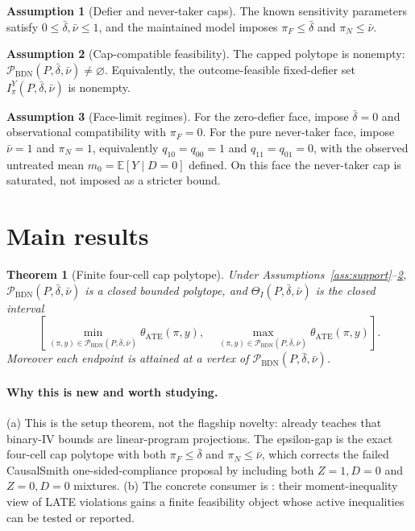 \documentclass[11pt]{article}
\newcommand{\E}{\mathbb{E}}
\theoremstyle{definition}
\newtheorem{assumption}{Assumption}
\theoremstyle{plain}
\newtheorem{theorem}{Theorem}
\theoremstyle{remark}
\begin{document}
\begin{assumption}[Defier and never-taker caps]\label{ass:caps}
The known sensitivity parameters satisfy \(0\le\bar\delta,\bar\nu\le1\), and
the maintained model imposes \(\pi_F\le\bar\delta\) and
\(\pi_N\le\bar\nu\).
\end{assumption}

\begin{assumption}[Cap-compatible feasibility]\label{ass:capped-feasible}
The capped polytope is nonempty:
\(\mathcal{P}_{\mathrm{BDN}}(P,\bar\delta,\bar\nu)\ne\varnothing\).
Equivalently, the outcome-feasible fixed-defier set
\(I_{\pi}^{Y}(P,\bar\delta,\bar\nu)\) is nonempty.
\end{assumption}

\begin{assumption}[Face-limit regimes]\label{ass:faces}
For the zero-defier face, impose \(\bar\delta=0\) and observational
compatibility with \(\pi_F=0\).  For the pure never-taker face, impose
\(\bar\nu=1\) and \(\pi_N=1\), equivalently \(q_{10}=q_{00}=1\) and
\(q_{11}=q_{01}=0\), with the observed untreated mean
\(m_0=\E[Y\mid D=0]\) defined.  On this face the never-taker cap is saturated,
not imposed as a stricter bound.
\end{assumption}

\section{Main results}
\begin{theorem}[Finite four-cell cap polytope]\label{thm:polytope-wellposed}
Under Assumptions~\ref{ass:support}--\ref{ass:capped-feasible},
\(\mathcal{P}_{\mathrm{BDN}}(P,\bar\delta,\bar\nu)\) is a closed bounded
polytope, and \(\Theta_I(P,\bar\delta,\bar\nu)\) is the closed interval
\[
\left[
\min_{(\pi,y)\in\mathcal{P}_{\mathrm{BDN}}(P,\bar\delta,\bar\nu)}
\theta_{\mathrm{ATE}}(\pi,y),\quad
\max_{(\pi,y)\in\mathcal{P}_{\mathrm{BDN}}(P,\bar\delta,\bar\nu)}
\theta_{\mathrm{ATE}}(\pi,y)
\right].
\]
Moreover each endpoint is attained at a vertex of
\(\mathcal{P}_{\mathrm{BDN}}(P,\bar\delta,\bar\nu)\).
\end{theorem}
\paragraph{Why this is new and worth studying.}
(a) This is the setup theorem, not the flagship novelty: \citet{BalkePearl1997}
already teaches that binary-IV bounds are linear-program projections.  The
epsilon-gap is the exact four-cell cap polytope with both
\(\pi_F\le\bar\delta\) and \(\pi_N\le\bar\nu\), which corrects the failed
CausalSmith one-sided-compliance proposal by including both \(Z=1,D=0\) and
\(Z=0,D=0\) mixtures.  (b) The concrete consumer is
\citet{MourifieWan2017}: their moment-inequality view of LATE violations gains
a finite feasibility object whose active inequalities can be tested or reported.
\end{document}
